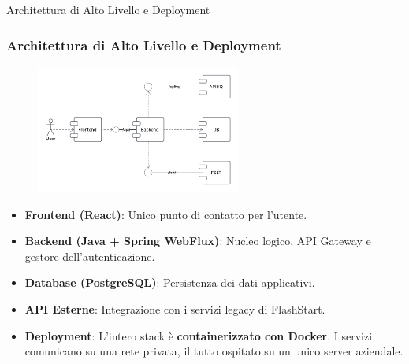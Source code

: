 \documentclass[8pt]{beamer}
\begin{document}
\begin{frame}{Architettura di Alto Livello e Deployment}
    \frametitle{Architettura di Alto Livello e Deployment}

    \begin{figure}
        \centering
        \includegraphics[width=0.6\textwidth]{figures/components.pdf}
    \end{figure}

    \begin{itemize}
        \item \textbf{Frontend (React)}: Unico punto di contatto per l'utente.
        \item \textbf{Backend (Java + Spring WebFlux)}: Nucleo logico, API Gateway e gestore dell'autenticazione.
        \item \textbf{Database (PostgreSQL)}: Persistenza dei dati applicativi.
        \item \textbf{API Esterne}: Integrazione con i servizi legacy di FlashStart.
        \item \alert{\textbf{Deployment}}: L'intero stack è \textbf{containerizzato con Docker}. I servizi comunicano su una rete privata, il tutto ospitato su un unico server aziendale.
    \end{itemize}
    
\end{frame}
\end{document}
